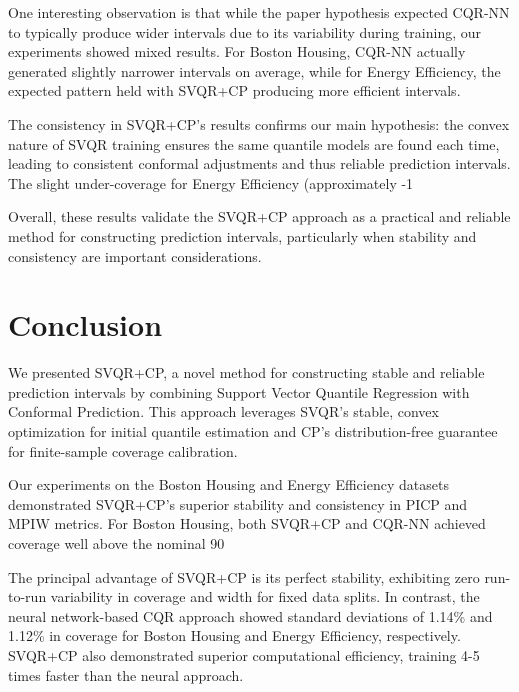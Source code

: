 \documentclass{article}
\begin{document}
One interesting observation is that while the paper hypothesis expected CQR-NN to typically produce wider intervals due to its variability during training, our experiments showed mixed results. For Boston Housing, CQR-NN actually generated slightly narrower intervals on average, while for Energy Efficiency, the expected pattern held with SVQR+CP producing more efficient intervals.

The consistency in SVQR+CP's results confirms our main hypothesis: the convex nature of SVQR training ensures the same quantile models are found each time, leading to consistent conformal adjustments and thus reliable prediction intervals. The slight under-coverage for Energy Efficiency (approximately -1%

Overall, these results validate the SVQR+CP approach as a practical and reliable method for constructing prediction intervals, particularly when stability and consistency are important considerations.

\section{Conclusion}
We presented SVQR+CP, a novel method for constructing stable and reliable prediction intervals by combining Support Vector Quantile Regression with Conformal Prediction. This approach leverages SVQR's stable, convex optimization for initial quantile estimation and CP's distribution-free guarantee for finite-sample coverage calibration.

Our experiments on the Boston Housing and Energy Efficiency datasets demonstrated SVQR+CP's superior stability and consistency in PICP and MPIW metrics. For Boston Housing, both SVQR+CP and CQR-NN achieved coverage well above the nominal 90%

The principal advantage of SVQR+CP is its perfect stability, exhibiting zero run-to-run variability in coverage and width for fixed data splits. In contrast, the neural network-based CQR approach showed standard deviations of 1.14\% and 1.12\% in coverage for Boston Housing and Energy Efficiency, respectively. SVQR+CP also demonstrated superior computational efficiency, training 4-5 times faster than the neural approach.
\end{document}
